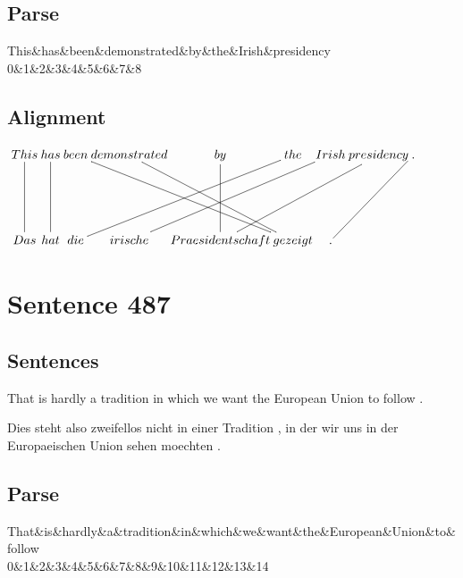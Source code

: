 \documentclass{report}
\begin{document}
\subsection*{Parse}
\begin{dependency}[theme=simple]
\begin{deptext}[column sep=.5cm, row sep=.1ex]
This\&has\&been\&demonstrated\&by\&the\&Irish\&presidency\\
0\&1\&2\&3\&4\&5\&6\&7\&8\\
\end{deptext}
\end{dependency}


\subsection*{Alignment}
\scriptsize{
$
\xymatrix@C-2.3pc{
This \ar @{-} [dd] & has \ar @{-} [dd] & been \ar @{-} [ddrrr] & demonstrated \ar @{-} [ddrr] & by \ar @{-} [dd] & the \ar @{-} [ddlll] & Irish \ar @{-} [ddlll] & presidency \ar @{-} [ddlll] & . \ar @{-} [ddll]\\\\
Das & hat & die & irische & Praesidentschaft & gezeigt & .
}$}
\newpage\section*{Sentence 487}

\subsection*{Sentences}
That is hardly a tradition in which we want the European Union to follow .

\noindent Dies steht also zweifellos nicht in einer Tradition , in der wir uns in der Europaeischen Union sehen moechten .



\subsection*{Parse}
\begin{dependency}[theme=simple]
\begin{deptext}[column sep=.5cm, row sep=.1ex]
That\&is\&hardly\&a\&tradition\&in\&which\&we\&want\&the\&European\&Union\&to\&follow\\
0\&1\&2\&3\&4\&5\&6\&7\&8\&9\&10\&11\&12\&13\&14\\
\end{deptext}
\end{dependency}
\end{document}
